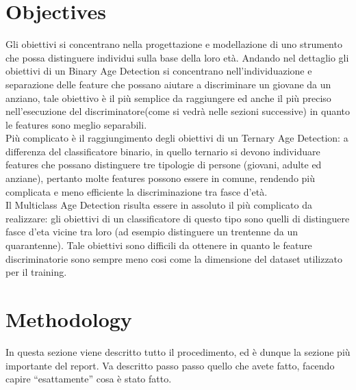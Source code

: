 \documentclass[12pt]{IEEEtran}
\begin{document}
\section{Objectives}
Gli obiettivi si concentrano nella progettazione e modellazione di uno strumento che possa distinguere individui sulla base della loro età. Andando nel dettaglio gli obiettivi di un Binary Age Detection si concentrano nell'individuazione e separazione delle feature che possano aiutare a discriminare un giovane da un anziano, tale obiettivo è il più semplice da raggiungere ed anche il più preciso nell'esecuzione del discriminatore(come si vedrà nelle sezioni successive) in quanto le features sono meglio separabili.\\
Più complicato è il raggiungimento degli obiettivi di un Ternary Age Detection: a differenza del classificatore binario, in quello ternario si devono individuare features che possano distinguere tre tipologie di persone (giovani, adulte ed anziane), pertanto molte features possono essere in comune, rendendo più complicata e meno efficiente la discriminazione tra fasce d'età.\\
Il Multiclass Age Detection risulta essere in assoluto il più complicato da realizzare: gli obiettivi di un classificatore di questo tipo sono quelli di distinguere fasce d'eta vicine tra loro (ad esempio distinguere un trentenne da un quarantenne). Tale obiettivi sono difficili da ottenere in quanto le feature discriminatorie sono sempre meno cosi come la dimensione del dataset utilizzato per il training. \\ 

\section{Methodology}

In questa sezione viene descritto tutto il procedimento, ed \`e dunque la sezione pi\`u importante del report. Va descritto passo passo quello che avete fatto, facendo capire ``esattamente'' cosa \`e stato fatto.
\end{document}
